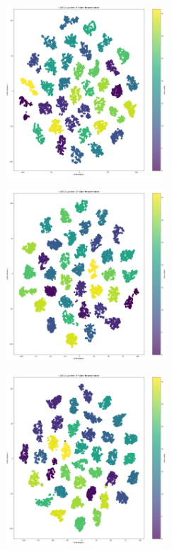 \begin{multicols}{2}
\includegraphics[width=0.45\textwidth]{Assets/tSNE/MobileNetV3Large.png}

\vspace{0.8cm}

\includegraphics[width=0.45\textwidth]{Assets/tSNE/ResNet50.png}

\vspace{0.8cm}

\includegraphics[width=0.45\textwidth]{Assets/tSNE/RESNET101.png}

\vspace{0.8cm}

\newpage


\end{multicols}

